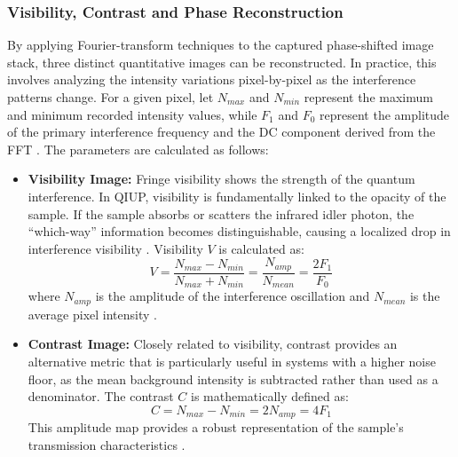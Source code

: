 \documentclass[12pt,a4paper]{article}
\begin{document}
    \subsubsection{Visibility, Contrast and Phase Reconstruction} 
        By applying Fourier-transform techniques to the captured phase-shifted image stack, three distinct quantitative images can be reconstructed. In practice, this involves analyzing the intensity variations pixel-by-pixel as the interference patterns change. For a given pixel, let $N_{max}$ and $N_{min}$ represent the maximum and minimum recorded intensity values, while $F_1$ and $F_0$ represent the amplitude of the primary interference frequency and the DC component derived from the \ac{FFT} \cite{pearce2023practical}. The parameters are calculated as follows:
        
        \begin{itemize}
            \item \textbf{Visibility Image:} Fringe visibility shows the strength of the quantum interference. In \ac{QIUP}, visibility is fundamentally linked to the opacity of the sample. If the sample absorbs or scatters the infrared idler photon, the ``which-way'' information becomes distinguishable, causing a localized drop in interference visibility \cite{lemos2014quantum, NonlinearInterferometry}. Visibility $V$ is calculated as:
            \begin{equation}
                V = \frac{N_{max}-N_{min}}{N_{max}+N_{min}} = \frac{N_{amp}}{N_{mean}} = \frac{2F_{1}}{F_{0}}
                \label{eq:visibility}
            \end{equation}
            where $N_{amp}$ is the amplitude of the interference oscillation and $N_{mean}$ is the average pixel intensity \cite{pearce2023practical}.
            
            \item \textbf{Contrast Image:} Closely related to visibility, contrast provides an alternative metric that is particularly useful in systems with a higher noise floor, as the mean background intensity is subtracted rather than used as a denominator. The contrast $C$ is mathematically defined as:
            \begin{equation}
                C = N_{max}-N_{min} = 2N_{amp} = 4F_{1}
                \label{eq:contrast}
            \end{equation}
            This amplitude map provides a robust representation of the sample's transmission characteristics \cite{pearce2023practical, xie2018surface}.
            

\end{itemize}
\end{document}
